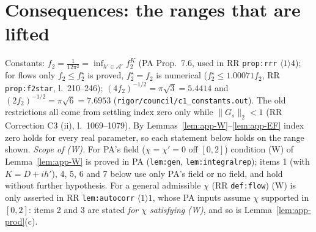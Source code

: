 \documentclass[11pt]{article}
\newcommand{\norm}[1]{\lVert#1\rVert}
\begin{document}
\section{Consequences: the ranges that are lifted}\label{sec:ranges}
Constants: $f_2=\frac1{12\pi^2}=\inf_{h'\in\mathcal A'}f_2^K$ (PA Prop.~7.6, used in RR \texttt{prop:rrr}
$\langle1\rangle4$); for flows only $f_2\le f_2^\star$ is proved, $f_2^\star=f_2$ is numerical ($f_2^\star\le1.00071f_2$,
RR \texttt{prop:f2star}, l.~210--246);
$(4f_2)^{-1/2}=\pi\sqrt3=5.4414$ and $(2f_2)^{-1/2}=\pi\sqrt6=7.6953$ (\texttt{rigor/council/c1\_constants.out}).
The old restrictions all come from settling index zero only while $\norm{G_s}_2<1$ (RR Correction C3 (ii),
l.~1069--1079).  By Lemmas~\ref{lem:app-W}--\ref{lem:app-EF} index zero holds for every real parameter, so each
statement below holds on the range shown.
\emph{Scope of (W).}  For PA's field ($\chi=\chi'=0$ off $[0,2]$) condition (W) of Lemma~\ref{lem:app-W} is proved in
PA (\texttt{lem:gen}, \texttt{lem:integralrep}); items 1 (with $K=D+ih'$), 4, 5, 6 and 7 below use only PA's field or no
field, and hold without further hypothesis.  For a general admissible $\chi$ (RR \texttt{def:flow}) (W) is only asserted
in RR \texttt{lem:autocorr} $\langle1\rangle1$, whose PA inputs assume $\chi$ supported in $[0,2]$: items 2 and 3 are
stated \emph{for $\chi$ satisfying (W)}, and so is Lemma~\ref{lem:app-prod}(c).
\end{document}
